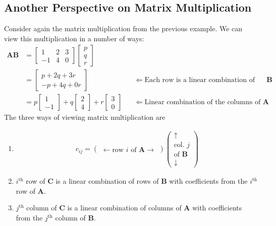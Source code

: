 \documentclass[11pt]{article}
\newcommand{\mat}[1]{\mathbf{#1}}
\begin{document}
\subsection*{Another Perspective on Matrix Multiplication}
Consider again the matrix multiplication from the previous example. We can view this multiplication in a number of ways:
\begin{align*}
\mat{A} \mat{B} &= \begin{bmatrix}1 & 2 & 3 \\ -1 & 4 & 0\end{bmatrix}\begin{bmatrix}p\\q\\r\end{bmatrix}
\\
&=
\begin{bmatrix}
p + 2q + 3r \\
-p + 4q + 0r
\end{bmatrix} && \Longleftarrow \text{Each row is a linear combination of rows of $\mat{B}$}
\\
&=
p \begin{bmatrix}1\\-1\end{bmatrix} +
q \begin{bmatrix}2\\4\end{bmatrix} +
r \begin{bmatrix}3\\0\end{bmatrix} && \Longleftarrow \text{Linear combination of the columns of $\mat{A}$}
\end{align*}
The three ways of viewing matrix multiplication are
\begin{enumerate}
\item{
\begin{align*}
c_{ij} =
\begin{pmatrix} \leftarrow \text{row $i$ of $\mat{A}$} \rightarrow \end{pmatrix}
\begin{pmatrix}
\uparrow
\\
\text{col. $j$}
\\
\text{of $\mat{B}$}
\\
\downarrow
\end{pmatrix}
\end{align*}
}
\item{
$i^\text{th}$ row of $\mat{C}$ is a linear combination of rows of $\mat{B}$ with coefficients from the $i^\text{th}$ row of $\mat{A}$.
}
\item{
$j^\text{th}$ column of $\mat{C}$ is a linear combination of columns of $\mat{A}$ with coefficients from the $j^\text{th}$ column of $\mat{B}$.
}
\end{enumerate}
\end{document}
